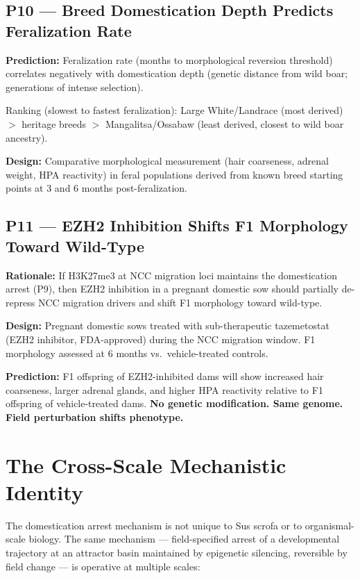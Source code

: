 \documentclass[11pt, a4paper]{article}
\begin{document}
\subsection{P10 --- Breed Domestication Depth
Predicts Feralization Rate}

\textbf{Prediction:} Feralization rate (months to
morphological reversion threshold) correlates
negatively with domestication depth (genetic distance
from wild boar; generations of intense selection).

Ranking (slowest to fastest feralization):
Large White/Landrace (most derived) $>$
heritage breeds $>$ Mangalitsa/Ossabaw
(least derived, closest to wild boar ancestry).

\textbf{Design:} Comparative morphological measurement
(hair coarseness, adrenal weight, HPA reactivity)
in feral populations derived from known breed
starting points at 3 and 6 months post-feralization.

\subsection{P11 --- EZH2 Inhibition Shifts F1
Morphology Toward Wild-Type}

\textbf{Rationale:} If H3K27me3 at NCC migration
loci maintains the domestication arrest (P9), then
EZH2 inhibition in a pregnant domestic sow should
partially de-repress NCC migration drivers and
shift F1 morphology toward wild-type.

\textbf{Design:} Pregnant domestic sows treated with
sub-therapeutic tazemetostat (EZH2 inhibitor,
FDA-approved) during the NCC migration window.
F1 morphology assessed at 6 months vs.\
vehicle-treated controls.

\textbf{Prediction:} F1 offspring of EZH2-inhibited
dams will show increased hair coarseness, larger
adrenal glands, and higher HPA reactivity relative
to F1 offspring of vehicle-treated dams.
\textbf{No genetic modification. Same genome.
Field perturbation shifts phenotype.}

\section{The Cross-Scale Mechanistic Identity}
\label{sec:crossscale}

The domestication arrest mechanism is not unique
to Sus scrofa or to organismal-scale biology.
The same mechanism --- field-specified arrest of
a developmental trajectory at an attractor basin
maintained by epigenetic silencing, reversible by
field change --- is operative at multiple scales:
\end{document}
